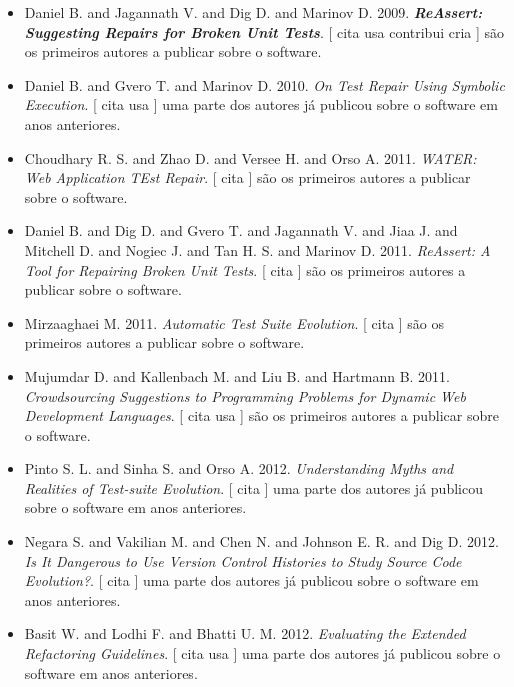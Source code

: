 \begin{itemize}
\item Daniel B. and Jagannath V. and Dig D. and Marinov D.
      2009.
        \textbf{\textit{ ReAssert: Suggesting Repairs for Broken Unit Tests}}.
      [
          cita
          usa
          contribui
          cria
      ]
são os primeiros autores a publicar sobre o software.
\item Daniel B. and Gvero T. and Marinov D.
      2010.
        \textit{ On Test Repair Using Symbolic Execution}.
      [
          cita
          usa
      ]
uma parte dos autores já publicou sobre o software em anos anteriores.
\item Choudhary R. S. and Zhao D. and Versee H. and Orso A.
      2011.
        \textit{ WATER: Web Application TEst Repair}.
      [
          cita
      ]
são os primeiros autores a publicar sobre o software.
\item Daniel B. and Dig D. and Gvero T. and Jagannath V. and Jiaa J. and Mitchell D. and Nogiec J. and Tan H. S. and Marinov D.
      2011.
        \textit{ ReAssert: A Tool for Repairing Broken Unit Tests}.
      [
          cita
      ]
são os primeiros autores a publicar sobre o software.
\item Mirzaaghaei M.
      2011.
        \textit{ Automatic Test Suite Evolution}.
      [
          cita
      ]
são os primeiros autores a publicar sobre o software.
\item Mujumdar D. and Kallenbach M. and Liu B. and Hartmann B.
      2011.
        \textit{ Crowdsourcing Suggestions to Programming Problems for Dynamic Web Development Languages}.
      [
          cita
          usa
      ]
são os primeiros autores a publicar sobre o software.
\item Pinto S. L. and Sinha S. and Orso A.
      2012.
        \textit{ Understanding Myths and Realities of Test-suite Evolution}.
      [
          cita
      ]
uma parte dos autores já publicou sobre o software em anos anteriores.
\item Negara S. and Vakilian M. and Chen N. and Johnson E. R. and Dig D.
      2012.
        \textit{ Is It Dangerous to Use Version Control Histories to Study Source Code Evolution?}.
      [
          cita
      ]
uma parte dos autores já publicou sobre o software em anos anteriores.
\item Basit W. and Lodhi F. and Bhatti U. M.
      2012.
        \textit{ Evaluating the Extended Refactoring Guidelines}.
      [
          cita
          usa
      ]
uma parte dos autores já publicou sobre o software em anos anteriores.

\end{itemize}
